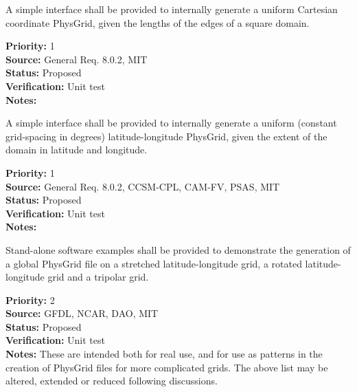 A simple interface shall be provided to internally generate a uniform Cartesian
coordinate PhysGrid, given the lengths of the edges of a square domain.
\begin{reqlist}
{\bf Priority:} 1 \\
{\bf Source:} General Req. 8.0.2, MIT \\
{\bf Status:} Proposed \\
{\bf Verification:} Unit test\\
{\bf Notes:} 
\end{reqlist}

A simple interface shall be provided to internally generate a uniform (constant
grid-spacing in degrees) latitude-longitude PhysGrid, given the extent of the domain
in latitude and longitude.                                                           
\begin{reqlist}
{\bf Priority:} 1 \\
{\bf Source:} General Req. 8.0.2, CCSM-CPL, 
CAM-FV, PSAS, MIT \\
{\bf Status:} Proposed \\
{\bf Verification:} Unit test\\
{\bf Notes:} 
\end{reqlist}

Stand-alone software examples shall be provided to demonstrate the generation of a
global PhysGrid file on a stretched latitude-longitude grid, a rotated
latitude-longitude grid and a tripolar grid. 
\begin{reqlist}
{\bf Priority:} 2 \\
{\bf Source:} GFDL, NCAR, 
DAO, MIT \\
{\bf Status:} Proposed \\
{\bf Verification:} Unit test\\
{\bf Notes:} These are intended both for real use, and for use as patterns in the
creation of PhysGrid files for more complicated grids.  The above list may be
altered, extended or reduced following discussions.
\end{reqlist}

